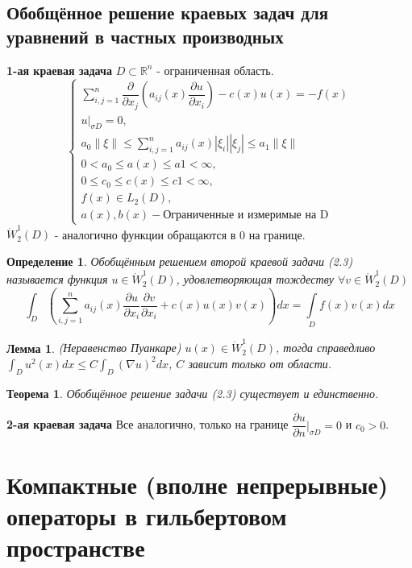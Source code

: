 \documentclass[9pt, a4paper]{extarticle}
\newtheorem{theorem}{Теорема}
\newtheorem{lemma}{Лемма}
\newtheorem{definition}{Определение}
\numberwithin{equation}{section}
\numberwithin{lemma}{section}
\numberwithin{definition}{section}
\numberwithin{notabene}{section}
\numberwithin{corollary}{section}
\begin{document}
\subsection{Обобщённое решение краевых задач для уравнений в частных производных}
\textbf{1-ая краевая задача}\newline
$D \subset \mathbb{R}^n$ - ограниченная область. 
\begin{equation}
	\begin{cases}
		\sum\limits_{i,j=1}^n \dfrac{\partial }{\partial x_j} \left(a_{ij}(x) \dfrac{\partial u}{\partial x_i}\right) - c(x)u(x) = - f(x) \\
		u\vert_{\sigma D} = 0, \\
		a_0 \|\xi\| \leq \sum\limits_{i,j=1}^{n} a_{ij}(x) |\xi_i| |\xi_j| \leq a_1 \|\xi\| \\ 	
		0 < a_0 \leq a(x) \leq a1 < \infty, \\
		0 \leq c_0 \leq c(x) \leq c1 < \infty, \\
		f(x) \in L_2(D), \\
		a(x), b(x) - \text{Ограниченные и измеримые на D}
	\end{cases}		
\end{equation}
$\dot{W}_2^1(D)$ - аналогично функции обращаются в 0 на границе.
\begin{definition}
	Обобщённым решением второй краевой задачи (2.3) называется функция $u \in \dot{W}_2^1(D)$, удовлетворяющая тождеству $\forall v \in \dot{W}_2^1(D)$
	$$
	\int_D \left(\sum\limits_{i,j = 1}^n a_{ij}(x) \dfrac{\partial u}{\partial x_i} \dfrac{\partial v}{\partial x_i} + c(x) u(x) v(x) \right) dx = \int\limits_D f(x)v(x)dx
	$$
\end{definition}
\begin{lemma}
	(Неравенство Пуанкаре)\newline
	$u(x) \in \dot{W}_2^1(D)$, тогда справедливо $\int_D u^2(x) dx  \leq C \int_D (\nabla u)^2 dx$, $C$ зависит только от области.
\end{lemma}
\begin{theorem}
	Обобщённое решение задачи (2.3) существует и единственно.
\end{theorem}
\textbf{2-ая краевая задача}\newline
Все аналогично, только на границе $\dfrac{\partial u}{\partial n}|_{\sigma D} = 0$ и $c_0 > 0$. 
\section{Компактные (вполне непрерывные) операторы в гильбертовом пространстве}
\end{document}
